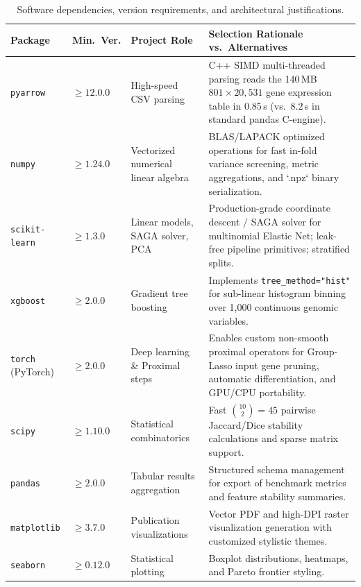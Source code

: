 \documentclass[10pt,a4paper]{article}
\begin{document}
\begin{table}[htbp]
\centering
\small
\renewcommand{\arraystretch}{1.2}
\begin{tabular}{p{2.8cm} p{1.8cm} p{4.2cm} p{6.8cm}}
\toprule
\textbf{Package} & \textbf{Min.\ Ver.} & \textbf{Project Role} & \textbf{Selection Rationale vs.\ Alternatives} \\
\midrule
\texttt{pyarrow} & $\ge 12.0.0$ & High-speed CSV parsing & C++ SIMD multi-threaded parsing reads the 140\,MB $801 \times 20{,}531$ gene expression table in $0.85$\,s (vs.\ $8.2$\,s in standard pandas C-engine). \\
\texttt{numpy} & $\ge 1.24.0$ & Vectorized numerical linear algebra & BLAS/LAPACK optimized operations for fast in-fold variance screening, metric aggregations, and `.npz` binary serialization. \\
\texttt{scikit-learn} & $\ge 1.3.0$ & Linear models, SAGA solver, PCA & Production-grade coordinate descent / SAGA solver for multinomial Elastic Net; leak-free pipeline primitives; stratified splits. \\
\texttt{xgboost} & $\ge 2.0.0$ & Gradient tree boosting & Implements \texttt{tree\_method="hist"} for sub-linear histogram binning over 1,000 continuous genomic variables. \\
\texttt{torch} (PyTorch) & $\ge 2.0.0$ & Deep learning \& Proximal steps & Enables custom non-smooth proximal operators for Group-Lasso input gene pruning, automatic differentiation, and GPU/CPU portability. \\
\texttt{scipy} & $\ge 1.10.0$ & Statistical combinatorics & Fast $\binom{10}{2} = 45$ pairwise Jaccard/Dice stability calculations and sparse matrix support. \\
\texttt{pandas} & $\ge 2.0.0$ & Tabular results aggregation & Structured schema management for export of benchmark metrics and feature stability summaries. \\
\texttt{matplotlib} & $\ge 3.7.0$ & Publication visualizations & Vector PDF and high-DPI raster visualization generation with customized stylistic themes. \\
\texttt{seaborn} & $\ge 0.12.0$ & Statistical plotting & Boxplot distributions, heatmaps, and Pareto frontier styling. \\
\bottomrule
\end{tabular}
\caption{Software dependencies, version requirements, and architectural justifications.}
\label{tab:packages}
\end{table}
\end{document}
